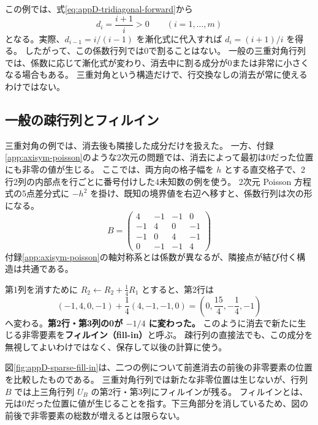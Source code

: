 この例では、式\eqref{eq:appD-tridiagonal-forward}から
\begin{equation}
 d_i=\frac{i+1}{i}>0\qquad(i=1,\ldots,m)
\label{eq:appD-positive-pivots}
\end{equation}
となる。実際、$d_{i-1}=i/(i-1)$ を漸化式に代入すれば $d_i=(i+1)/i$ を得る。
したがって、この係数行列では0で割ることはない。
一般の三重対角行列では、係数に応じて漸化式が変わり、消去中に割る成分が0または非常に小さくなる場合もある。
三重対角という構造だけで、行交換なしの消去が常に使えるわけではない。

\subsection{一般の疎行列とフィルイン}

三重対角の例では、消去後も隣接した成分だけを扱えた。
一方、付録\ref{app:axisym-poisson}のような2次元の問題では、消去によって最初は0だった位置にも非零の値が生じる。
ここでは、両方向の格子幅を $h$ とする直交格子で、2行2列の内部点を行ごとに番号付けした4未知数の例を使う。
2次元 Poisson 方程式の5点差分式に $-h^2$ を掛け、既知の境界値を右辺へ移すと、係数行列は次の形になる。
\begin{equation}
 B=\begin{pmatrix}
 4&-1&-1&0\\
 -1&4&0&-1\\
 -1&0&4&-1\\
 0&-1&-1&4
 \end{pmatrix}
\label{eq:appD-sparse2d-example}
\end{equation}
付録\ref{app:axisym-poisson}の軸対称系とは係数が異なるが、隣接点が結び付く構造は共通である。

第1列を消すために $R_2\leftarrow R_2+\frac14R_1$ とすると、第2行は
\begin{equation}
 (-1,4,0,-1)+\frac14(4,-1,-1,0)
 =\left(0,\frac{15}{4},-\frac14,-1\right)
\label{eq:appD-fill-example}
\end{equation}
へ変わる。\textbf{第2行・第3列の0が $-1/4$ に変わった。}
このように消去で新たに生じる非零要素を\textbf{フィルイン（fill-in）}と呼ぶ。
疎行列の直接法でも、この成分を無視してよいわけではなく、保存して以後の計算に使う。


図\ref{fig:appD-sparse-fill-in}は、二つの例について前進消去の前後の非零要素の位置を比較したものである。
三重対角行列では新たな非零位置は生じないが、行列 $B$ では上三角行列 $U_B$ の第2行・第3列にフィルインが残る。
フィルインとは、元は0だった位置に値が生じることを指す。下三角部分を消しているため、図の前後で非零要素の総数が増えるとは限らない。

